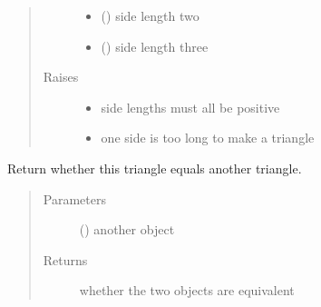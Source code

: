\documentclass[letterpaper,10pt,english]{sphinxmanual}
\begin{document}
\begin{fulllineitems}
\begin{fulllineitems}
\begin{quote}
\begin{description}
\begin{itemize}
\item {} 
 () \textendash{} side length two

\item {} 
 () \textendash{} side length three

\end{itemize}

\item[{Raises}] \leavevmode\begin{itemize}
\item {} 
 \textendash{} side lengths must all be positive

\item {} 
 \textendash{} one side is too long to make a triangle

\end{itemize}

\end{description}\end{quote}

\end{fulllineitems}


\begin{fulllineitems}
\label{\detokenize{api:trianglelib.shape.Triangle.is_equivalent}}
Return whether this triangle equals another triangle.
\begin{quote}\begin{description}
\item[{Parameters}] \leavevmode
{} ({\hyperref[\detokenize{api:trianglelib.shape.Triangle}]{}}) \textendash{} another {\hyperref[\detokenize{api:trianglelib.shape.Triangle}]{}} object

\item[{Returns}] \leavevmode
whether the two {\hyperref[\detokenize{api:trianglelib.shape.Triangle}]{}} objects are equivalent


\end{description}
\end{quote}
\end{fulllineitems}
\end{fulllineitems}
\end{document}
